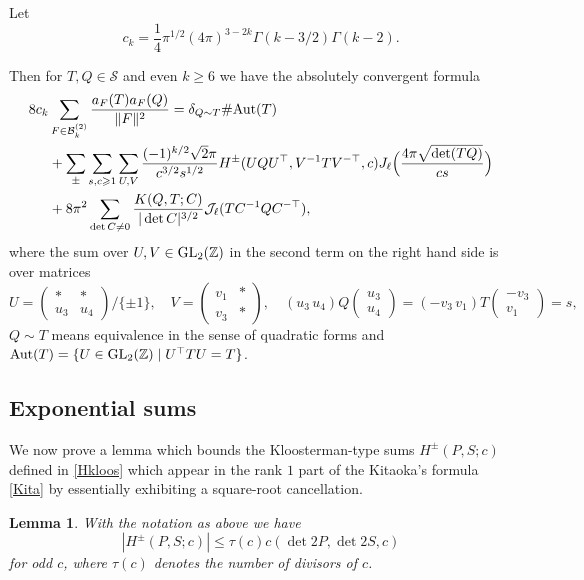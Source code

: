 \documentclass[11pt]{amsart}
\numberwithin{equation}{section}
\theoremstyle{plain}
\newtheorem{lemma}{Lemma}
\theoremstyle{definition}
\renewcommand{\geq}{\geqslant}
\renewcommand{\leq}{\le}
\numberwithin{equation}{section}
\begin{document}
Let   
 \begin{equation}\label{ck}
      c_k =  \frac{1}{4}   \pi^{1/2}   (4\pi)^{3-2k} \Gamma(k-3/2)\Gamma(k-2).
      \end{equation}
 
 Then  for $T, Q\in \mathcal{S}$ and even $k \geq 6$ we have the absolutely convergent formula
  \begin{align}\label{Kita}
8 c_k & \sum_{F \in \mathcal{B}_k^{(2)}} \frac{a_F(T) a_F(Q)}{\| F \|^2}   = \delta_{Q \sim T} \#\text{{\rm Aut}}(T)\\
& +   \sum_{\pm} \sum_{s, c\geq 1} \sum_{U, V} \frac{(-1)^{k/2} \sqrt{2} \pi}{c^{3/2}s^{1/2}} H^{\pm} (UQU^{\top}, V^{-1} T V^{-\top} , c)J_{\ell}  \Big(\frac{4\pi \sqrt{\det(TQ)}}{c s}\Big)\\
& + 8\pi^2   \sum_{\det C \not= 0} \frac{K(Q, T; C)}{|\det C|^{3/2}}  \mathcal{J}_{\ell}(T C^{-1} Q C^{-\top}),
\end{align}
where the sum over $U, V \in {\rm GL}_2(\mathbb{Z})$ in the second term on the right hand side is over matrices 
$$U  = \left(\begin{matrix} * & *\\ u_3 & u_4 \end{matrix}\right)/\{\pm 1\},  \quad  %
V  = \left(\begin{matrix} v_1 & *\\ v_3 &* \end{matrix}\right), \quad  (u_3\, u_4) Q \left(\begin{matrix} u_3\\ u_4\end{matrix}\right) = (-v_3\, v_1) T \left(\begin{matrix} -v_3\\ v_1\end{matrix}\right) = s,%
$$ 
$Q \sim T$ means equivalence in the sense of quadratic forms and $\text{{\rm Aut}}(T) = \{U \in {\rm GL}_2(\mathbb{Z}) \mid U^{\top} T U = T\}$.   
 
 \subsection{Exponential sums}
 We now prove a lemma which bounds the Kloosterman-type sums $H^{\pm}(P, S; c)$ defined in \eqref{Hkloos} which appear in the rank $1$ part of the Kitaoka's formula \eqref{Kita} by essentially exhibiting a square-root cancellation.
 \begin{lemma}\label{exp} With the notation as above we have
 \[ |H^{\pm}(P, S; c)| \leq \tau(c) c (\det 2P, \det 2S, c) \]
for odd $c$,  where $\tau(c)$ denotes the number of divisors of $c$. 
 \end{lemma}
\end{document}
